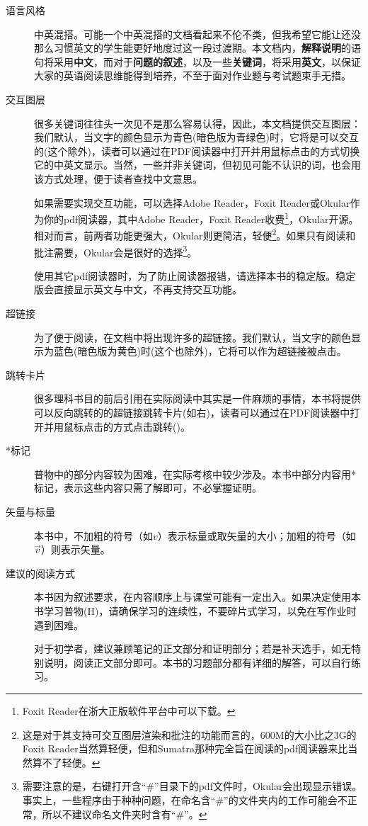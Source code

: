 \begin{description}
    \item[语言风格]中英混搭。可能一个中英混搭的文档看起来不伦不类，但我希望它能让还没那么习惯英文的学生能更好地度过这一段过渡期。本文档内，\textbf{解释说明}的语句将采用\textbf{中文}，而对于\textbf{问题的叙述}，以及一些\textbf{关键词}，将采用\textbf{英文}，以保证大家的英语阅读思维能得到培养，不至于面对作业题与考试题束手无措。
    \item[交互图层] 很多关键词往往头一次见不是那么容易认得，因此，本文档提供交互图层：我们默认，当文字的颜色显示为{\color{plaincyan}青色(暗色版为青绿色)}时，它将是可以交互的(这个除外)，读者可以通过在PDF阅读器中打开并用鼠标点击的方式切换它的中英文显示。当然，一些并非关键词，但初见可能不认识的词，也会用该方式处理，便于读者查找中文意思。

          如果需要实现交互功能，可以选择Adobe Reader，Foxit Reader或Okular作为你的pdf阅读器，其中Adobe Reader，Foxit Reader收费\footnote{Foxit Reader在浙大正版软件平台中可以下载。}，Okular开源。相对而言，前两者功能更强大，Okular则更简洁，轻便\footnote{这是对于其支持可交互图层渲染和批注的功能而言的，600M的大小比之3G的Foxit Reader当然算轻便，但和Sumatra那种完全旨在阅读的pdf阅读器来比当然算不了轻便。}。如果只有阅读和批注需要，Okular会是很好的选择\footnote{需要注意的是，右键打开含``\#''目录下的pdf文件时，Okular会出现显示错误。事实上，一些程序由于种种问题，在命名含``\#''的文件夹内的工作可能会不正常，所以不建议命名文件夹时含有``\#''。}。

          使用其它pdf阅读器时，为了防止阅读器报错，请选择本书的稳定版。稳定版会直接显示英文与中文，不再支持交互功能。

    \item[超链接]为了便于阅读，在文档中将出现许多的超链接。我们默认，当文字的颜色显示为{\color{thisblue}蓝色(暗色版为黄色)}时(这个也除外)，它将可以作为超链接被点击。
    \item[跳转卡片]很多理科书目的前后引用在实际阅读中其实是一件麻烦的事情，本书将提供可以反向跳转的的超链接跳转卡片(如右)，读者可以通过在PDF阅读器中打开并用鼠标点击的方式点击跳转()。
    \item[*标记]普物中的部分内容较为困难，在实际考核中较少涉及。本书中部分内容用*标记，表示这些内容只需了解即可，不必掌握证明。
    \item [矢量与标量]本书中，不加粗的符号（如$v$）表示标量或取矢量的大小；加粗的符号（如$\vec{v}$）则表示矢量。
    \item [建议的阅读方式] 本书因为叙述要求，在内容顺序上与课堂可能有一定出入。如果决定使用本书学习普物(H)，请确保学习的连续性，不要碎片式学习，以免在写作业时遇到困难。

          对于初学者，建议兼顾笔记的正文部分和证明部分；若是补天选手，如无特别说明，阅读正文部分即可。本书的习题部分都有详细的解答，可以自行练习。
\end{description}
